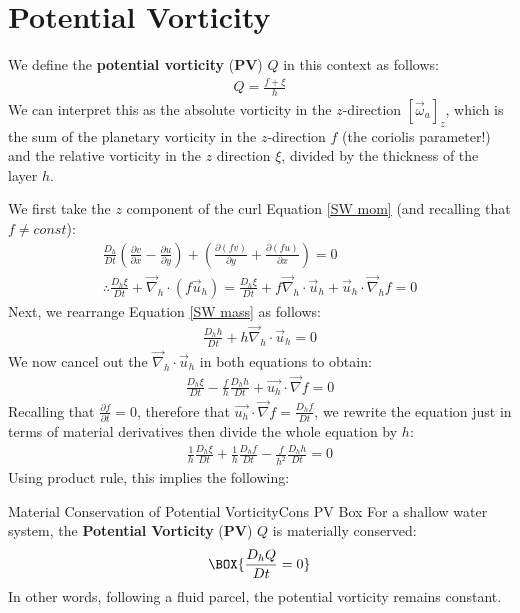 \section{Potential Vorticity}\label{PV}

We define the \textbf{potential vorticity} (\textbf{PV}) $Q$ in this context as follows:
\begin{align*}
    \boxed{Q = \frac{f+\xi}{h}}
\end{align*}
We can interpret this as the absolute vorticity in the $z$-direction $[\vec{\omega}_a]_z$, which is the sum of the planetary vorticity in the $z$-direction $f$ (the coriolis parameter!) and the relative vorticity in the $z$ direction $\xi$, divided by the thickness of the layer $h$.

We first take the $z$ component of the curl Equation \ref{SW mom} (and recalling that $f\neq const$):
\begin{align*}
    \frac{D_h}{Dt}\left( \frac{\partial v}{\partial x}- \frac{\partial u}{\partial y}\right) + \left( \frac{\partial (fv)}{\partial y} + \frac{\partial (fu)}{\partial x}\right) = 0
    \\
    \therefore \frac{D_h \xi}{Dt} + \vec{\nabla}_h \cdot \left( f\vec{u}_h \right)= \frac{D_h \xi}{Dt} + f\vec{\nabla}_h \cdot\vec{u}_h + \vec{u}_h \cdot \vec{\nabla}_h f = 0
\end{align*}
Next, we rearrange Equation \ref{SW mass} as follows:
\begin{align*}
    \frac{D_h h}{Dt}+h\vec{\nabla}_h \cdot \vec{u}_h=0
\end{align*}
We now cancel out the $\vec{\nabla}_h\cdot \vec{u}_h$ in both equations to obtain:
\begin{align*}
    \frac{D_h \xi}{Dt} - \frac{f}{h}\frac{D_h h}{Dt} + \vec{u_h}\cdot\vec{\nabla}f = 0
\end{align*}
Recalling that $\frac{\partial f}{\partial t}=0$, therefore that $\vec{u_h}\cdot\vec{\nabla}f=\frac{D_h f}{Dt}$, we rewrite the equation just in terms of material derivatives then divide the whole equation by $h$:
\begin{align*}
    \frac{1}{h}\frac{D_h \xi}{Dt} +\frac{1}{h}\frac{D_h f}{Dt} - \frac{f}{h^2}\frac{D_h h}{Dt}=0
\end{align*}
Using product rule, this implies the following:

\begin{fact}{Material Conservation of Potential Vorticity}{Cons PV Box}\label{Cons PV Box}
    For a shallow water system, the \textbf{Potential Vorticity} (\textbf{PV}) $Q$ is materially conserved: 
    \begin{align}
        \BOX{
            \frac{D_h Q}{Dt}=0
        }
    \end{align}
    In other words, following a fluid parcel, the potential vorticity remains constant.
\end{fact}



